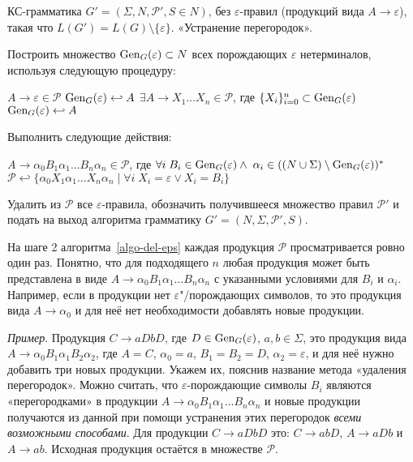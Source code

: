 {КС-грамматика $G'=(\Sigma, N, \mathcal P', S \in N)$, без
$\varepsilon$-правил (продукций вида $A \to \varepsilon$), такая что
$L(G')=L(G) \setminus \{ \varepsilon \}$.}
{«Устранение перегородок».}
{
  \item Построить множество $\operatorname{Gen}_G(\varepsilon) \subset N$ всех порождающих
  $\varepsilon$ нетерминалов, используя следующую процедуру:
  \begin{codebox}
  \li   \For $A \to \varepsilon \in \mathcal P$
  \zi   \Do
            $\operatorname{Gen}_G(\varepsilon) \hookleftarrow A$
        \End
  \li   \While $\exists A \to X_1 \ldots X_n \in \mathcal P$,
        где $\{ X_i \}_{i=0}^n \subset \operatorname{Gen}_G(\varepsilon)$
  \zi       \Do
            $\operatorname{Gen}_G(\varepsilon) \hookleftarrow A$
            \End
        \End
  \end{codebox}
  \item\label{remove-barriers} Выполнить следующие действия:
  \begin{codebox}
  \zi \For $A \to \alpha_0 B_1 \alpha_1 \ldots B_n \alpha_n \in \mathcal P$, где
  $\forall i \; B_i \in \operatorname{Gen}_G(\varepsilon) \wedge \;
  \alpha_i \in ((N \cup \Sigma) \setminus \operatorname{Gen}_G(\varepsilon))^*$
  \zi   \Do
        $\mathcal P \hookleftarrow
            \{ \alpha_0 X_1 \alpha_1 \ldots X_n \alpha_n \mid
            \forall i \; X_i = \varepsilon \vee X_i = B_i \}$
        \End
  \end{codebox}
  \item Удалить из $\mathcal P$ все $\varepsilon$-правила, обозначить
  получившееся множество правил $\mathcal P'$ и подать на выход алгоритма
  грамматику $G' = (N, \Sigma, \mathcal P', S)$.
}

\begin{myremark}
На шаге 2 алгоритма~\ref{algo-del-eps} каждая продукция $\mathcal P$ просматривается ровно
один раз. Понятно, что для подходящего $n$ любая продукция может быть
представлена в виде $A \to \alpha_0 B_1 \alpha_1 \ldots B_n \alpha_n$ с
указанными условиями для $B_i$ и $\alpha_i$. Например, если в продукции нет
$\varepsilon$"/порождающих символов, то это продукция вида $A \to
\alpha_0$ и для неё нет необходимости добавлять новые продукции.

\emph{Пример}. Продукция $C \to aDbD$, где $D \in \operatorname{Gen}_G(\varepsilon)$, $a, b \in
\Sigma$, это продукция вида $A \to \alpha_0 B_1 \alpha_1 B_2 \alpha_2$, где $A =
C$, $\alpha_0 = a$, $B_1 = B_2 = D$, $\alpha_2 = \varepsilon$, и для неё нужно
добавить три новых продукции. Укажем их, пояснив название метода «удаления
перегородок». Можно считать, что $\varepsilon$-порождающие символы $B_i$ являются
«перегородками» в продукции $A \to \alpha_0 B_1 \alpha_1 \ldots B_n \alpha_n$ и
новые продукции получаются из данной при помощи устранения этих перегородок \emph{всеми
возможными способами}. Для продукции $C \to aDbD$ это: $C \to abD$, $A \to aDb$ и
$A \to ab$. Исходная продукция остаётся в множестве $\mathcal P$.
\end{myremark}

